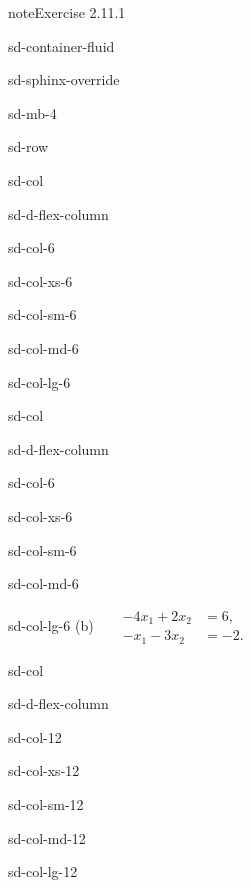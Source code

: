\documentclass[letterpaper,10pt,english]{jupyterBook}
\begin{document}
\begin{sphinxadmonition}{note}{Exercise 2.11.1}
\begin{sphinxuseclass}{sd-container-fluid}
\begin{sphinxuseclass}{sd-sphinx-override}
\begin{sphinxuseclass}{sd-mb-4}
\begin{sphinxuseclass}{sd-row}
\begin{sphinxuseclass}{sd-col}
\begin{sphinxuseclass}{sd-d-flex-column}
\begin{sphinxuseclass}{sd-col-6}
\begin{sphinxuseclass}{sd-col-xs-6}
\begin{sphinxuseclass}{sd-col-sm-6}
\begin{sphinxuseclass}{sd-col-md-6}
\begin{sphinxuseclass}{sd-col-lg-6}
\end{sphinxuseclass}
\end{sphinxuseclass}
\end{sphinxuseclass}
\end{sphinxuseclass}
\end{sphinxuseclass}
\end{sphinxuseclass}
\end{sphinxuseclass}
\begin{sphinxuseclass}{sd-col}
\begin{sphinxuseclass}{sd-d-flex-column}
\begin{sphinxuseclass}{sd-col-6}
\begin{sphinxuseclass}{sd-col-xs-6}
\begin{sphinxuseclass}{sd-col-sm-6}
\begin{sphinxuseclass}{sd-col-md-6}
\begin{sphinxuseclass}{sd-col-lg-6}
\sphinxAtStartPar
(b)  
\( \begin{align*}
     - 4 x_{1} + 2 x_{2} &= 6, \\
     - x_{1} - 3 x_{2} &= -2.
\end{align*} \)

\end{sphinxuseclass}
\end{sphinxuseclass}
\end{sphinxuseclass}
\end{sphinxuseclass}
\end{sphinxuseclass}
\end{sphinxuseclass}
\end{sphinxuseclass}
\begin{sphinxuseclass}{sd-col}
\begin{sphinxuseclass}{sd-d-flex-column}
\begin{sphinxuseclass}{sd-col-12}
\begin{sphinxuseclass}{sd-col-xs-12}
\begin{sphinxuseclass}{sd-col-sm-12}
\begin{sphinxuseclass}{sd-col-md-12}
\begin{sphinxuseclass}{sd-col-lg-12}
\sphinxAtStartPar
 


\end{sphinxuseclass}
\end{sphinxuseclass}
\end{sphinxuseclass}
\end{sphinxuseclass}
\end{sphinxuseclass}
\end{sphinxuseclass}
\end{sphinxuseclass}
\end{sphinxuseclass}
\end{sphinxuseclass}
\end{sphinxuseclass}
\end{sphinxuseclass}
\end{sphinxadmonition}
\end{document}
